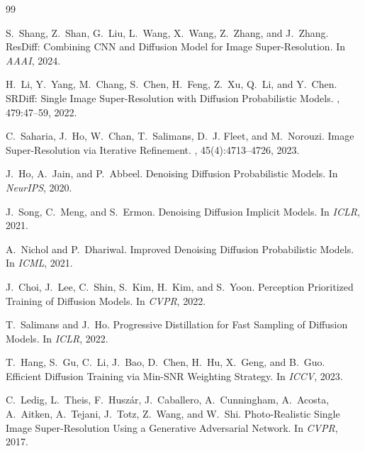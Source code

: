\documentclass[11pt]{article}
\begin{document}
\begin{thebibliography}{99}


S.~Shang, Z.~Shan, G.~Liu, L.~Wang, X.~Wang, Z.~Zhang, and J.~Zhang.
\newblock ResDiff: Combining CNN and Diffusion Model for Image Super-Resolution.
\newblock In {\em AAAI}, 2024.

H.~Li, Y.~Yang, M.~Chang, S.~Chen, H.~Feng, Z.~Xu, Q.~Li, and Y.~Chen.
\newblock SRDiff: Single Image Super-Resolution with Diffusion Probabilistic Models.
, 479:47--59, 2022.

C.~Saharia, J.~Ho, W.~Chan, T.~Salimans, D.~J. Fleet, and M.~Norouzi.
\newblock Image Super-Resolution via Iterative Refinement.
, 45(4):4713--4726, 2023. %

J.~Ho, A.~Jain, and P.~Abbeel.
\newblock Denoising Diffusion Probabilistic Models.
\newblock In {\em NeurIPS}, 2020.

J.~Song, C.~Meng, and S.~Ermon.
\newblock Denoising Diffusion Implicit Models.
\newblock In {\em ICLR}, 2021.

A.~Nichol and P.~Dhariwal.
\newblock Improved Denoising Diffusion Probabilistic Models.
\newblock In {\em ICML}, 2021.

J.~Choi, J.~Lee, C.~Shin, S.~Kim, H.~Kim, and S.~Yoon.
\newblock Perception Prioritized Training of Diffusion Models.
\newblock In {\em CVPR}, 2022. %

T.~Salimans and J.~Ho.
\newblock Progressive Distillation for Fast Sampling of Diffusion Models.
\newblock In {\em ICLR}, 2022.

T.~Hang, S.~Gu, C.~Li, J.~Bao, D.~Chen, H.~Hu, X.~Geng, and B.~Guo.
\newblock Efficient Diffusion Training via Min-SNR Weighting Strategy.
\newblock In {\em ICCV}, 2023. %

C.~Ledig, L.~Theis, F.~Husz\'ar, J.~Caballero, A.~Cunningham, A.~Acosta,
A.~Aitken, A.~Tejani, J.~Totz, Z.~Wang, and W.~Shi.
\newblock Photo-Realistic Single Image Super-Resolution Using a Generative
Adversarial Network.
\newblock In {\em CVPR}, 2017.


\end{thebibliography}
\end{document}
